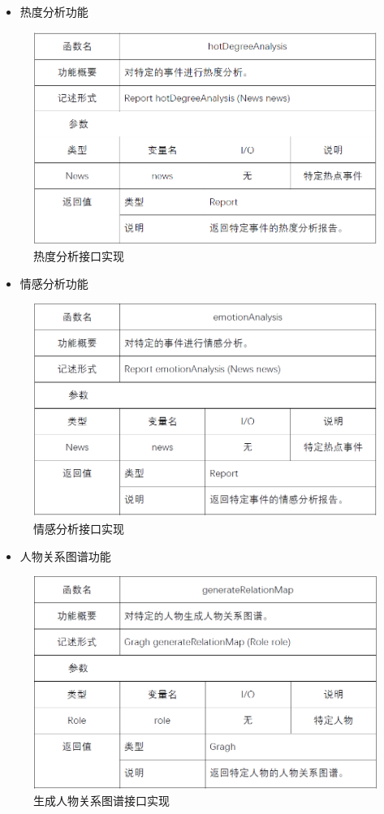 \begin{itemize}
	\item 热度分析功能
\end{itemize}
\begin{figure}[!htbp]
	\centering
	\includegraphics[scale=0.75]{image/b24.png} %
	\caption{热度分析接口实现} %
\end{figure}
\begin{itemize}
	\item 情感分析功能
\end{itemize}
\begin{figure}[!htbp]
	\centering
	\includegraphics[scale=0.75]{image/b25.png} %
	\caption{情感分析接口实现} %
\end{figure}
\begin{itemize}
	\item 人物关系图谱功能
\end{itemize}
\begin{figure}[!htbp]
	\centering
	\includegraphics[scale=0.75]{image/b26.png} %
	\caption{生成人物关系图谱接口实现} %
\end{figure}

